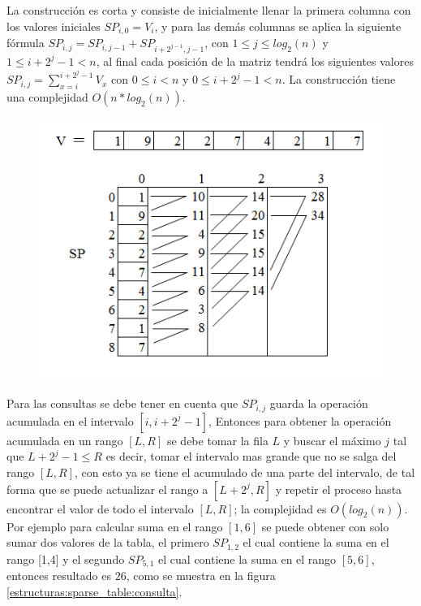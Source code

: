 \documentclass[12pt, a4paper]{article}
\newcommand\cppfile[2][]{

}
\begin{document}
	La construcción es corta y consiste de inicialmente llenar la primera columna con los valores iniciales 
	$SP_{i,0} = V_{i}$, y para las demás columnas se aplica la siguiente fórmula 
	$SP_{i,j} = SP_{i,j-1} + SP_{i+2^{j-1},j-1}$, con $1 \leq j \leq log_{2}(n)$ y $1 \leq i+2^{j}-1 < n$, al 
	final cada posición de la matriz tendrá los siguientes valores $SP_{i,j} = \sum_{x=i}^{i+2^{j}-1} V_{x}$ con
	$0 \leq i < n$ y $0 \leq i+2^{j}-1 < n$. La construcción tiene una complejidad $O(n*log_{2}(n))$.
	
	\begin{figure}[!htb]
			\centering
			\includegraphics[scale=0.65]{Estructuras_de_datos/imagenes/sparse_table/construccion}
			\caption{}
			\label{estructuras:sparse_table:construccion}
		\endminipage
			\cppfile[9-17]{Estructuras_de_datos/codigos/sparse_table.cpp}
		\endminipage
	\end{figure}
	
	Para las consultas se debe tener en cuenta que $SP_{i,j}$ guarda la operación acumulada en el intervalo 
	$[i,i+2^{j}-1]$, Entonces para obtener la operación acumulada en un rango 
	$[L,R]$ se debe tomar la fila $L$ y buscar el máximo $j$ tal que $L+2^{j}-1 \leq R$ es decir, tomar el intervalo 
	mas grande que no se salga del rango $[L,R]$, con esto ya se tiene el acumulado de una parte del intervalo, de tal 
	forma que se puede actualizar el rango a $[L+2^{j}, R]$ y repetir el proceso hasta encontrar el valor de todo el
	intervalo $[L,R]$; la complejidad es $O(log_{2}(n))$. Por ejemplo para calcular suma en el rango $[1,6]$ se puede 
	obtener con solo sumar dos valores 
	de la tabla, el primero $SP_{1,2}$ el cual contiene la suma en el rango [1,4] y el segundo $SP_{5,1}$ el cual
	contiene la suma en el rango $[5,6]$, entonces resultado es $26$, como se muestra en la figura 
	\ref{estructuras:sparse_table:consulta}.
	
\end{document}
